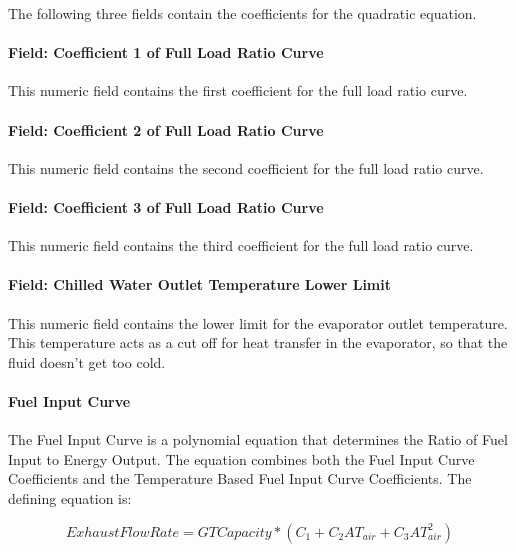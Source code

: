 The following three fields contain the coefficients for the quadratic equation.

\paragraph{Field: Coefficient 1 of Full Load Ratio Curve}\label{field-coefficient-1-of-full-load-ratio-curve-2}

This numeric field contains the first coefficient for the full load ratio curve.

\paragraph{Field: Coefficient 2 of Full Load Ratio Curve}\label{field-coefficient-2-of-full-load-ratio-curve-2}

This numeric field contains the second coefficient for the full load ratio curve.

\paragraph{Field: Coefficient 3 of Full Load Ratio Curve}\label{field-coefficient-3-of-full-load-ratio-curve-2}

This numeric field contains the third coefficient for the full load ratio curve.

\paragraph{Field: Chilled Water Outlet Temperature Lower Limit}\label{field-chilled-water-outlet-temperature-lower-limit-4}

This numeric field contains the lower limit for the evaporator outlet temperature. This temperature acts as a cut off for heat transfer in the evaporator, so that the fluid doesn't get too cold.

\paragraph{Fuel Input Curve}\label{fuel-input-curve}

The Fuel Input Curve is a polynomial equation that determines the Ratio of Fuel Input to Energy Output. The equation combines both the Fuel Input Curve Coefficients and the Temperature Based Fuel Input Curve Coefficients. The defining equation is:

\begin{equation}
ExhaustFlowRate = GTCapacity * ({C_1} + {C_2}A{T_{air}} + {C_3}AT_{air}^2)
\end{equation}

